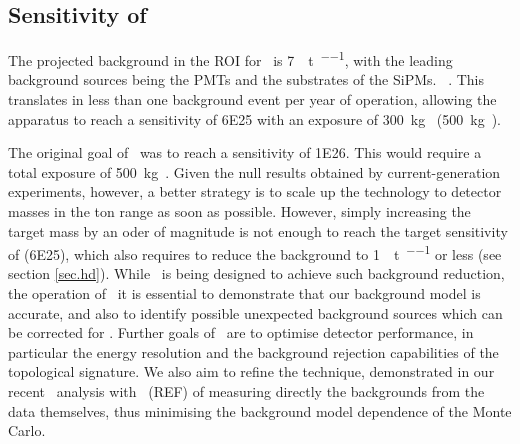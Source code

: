 
\subsection{Sensitivity of \Next}

The projected background in the ROI for \Next\ is \SI{7}{\ev\per\tonne\per\yr}, with the leading background sources being the PMTs and the substrates of the SiPMs.
~\cite{Martin-Albo:2015rhw}.  This translates in less than one background event per year of operation, allowing the apparatus to reach 
a sensitivity of \SI{6E25}{\yr} with an exposure of \SI{300}{\kg\yr} (\SI{500}{\kg\yr}). 

The original goal of \Next\ was to reach a sensitivity of \SI{1E26}{\yr}. This would require a total exposure of \SI{500}{\kg\yr}. Given the null results obtained 
by current-generation experiments, however, a better strategy is to scale up the technology to detector masses in the ton range as soon as possible. However, simply increasing the target mass by an oder of magnitude is not enough to reach the target sensitivity of \NHD (\SI{6E25}{\yr}), which also requires to reduce the background to \SI{1}{\ev\per\tonne\per\yr} or less (see section \ref{sec.hd}). While \NHD\ is being designed to achieve such background reduction, the operation of \Next\ it is essential to demonstrate that our background model is accurate, and also to identify possible unexpected background sources which can be corrected for \NHD. Further goals of \Next\ are to optimise detector performance, in particular the energy resolution and the background rejection capabilities of the topological signature. We also aim to refine the technique, demonstrated in our recent \bbtnu\ analysis with \NEW\ (REF) of measuring directly the backgrounds from the data themselves, thus minimising the background model dependence of the Monte Carlo.  




